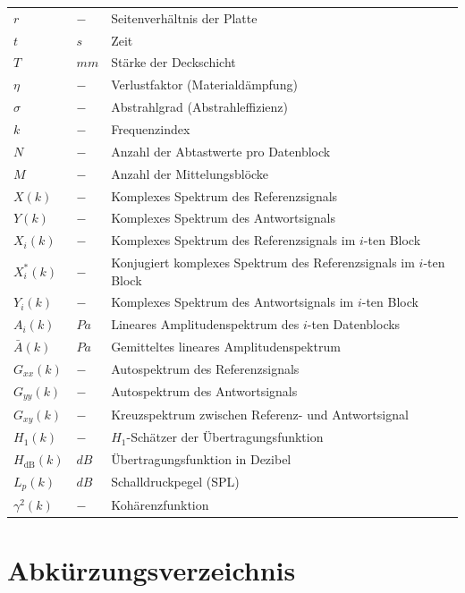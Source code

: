 \begin{longtable}[l]{l l p{8.5cm}}
$r$ & $-$ & Seitenverhältnis der Platte\\

$t$ & $s$ & Zeit\\
$T$ & $mm$ & Stärke der Deckschicht\\

$\eta$ & $-$ & Verlustfaktor (Materialdämpfung)\\
$\sigma$ & $-$ & Abstrahlgrad (Abstrahleffizienz)\\

$k$ & $-$ & Frequenzindex\\
$N$ & $-$ & Anzahl der Abtastwerte pro Datenblock\\
$M$ & $-$ & Anzahl der Mittelungsblöcke\\
$X(k)$ & $-$ & Komplexes Spektrum des Referenzsignals\\
$Y(k)$ & $-$ & Komplexes Spektrum des Antwortsignals\\
$X_i(k)$ & $-$ & Komplexes Spektrum des Referenzsignals im $i$-ten Block\\
$X_i^*(k)$ & $-$ & Konjugiert komplexes Spektrum des Referenzsignals im $i$-ten Block\\
$Y_i(k)$ & $-$ & Komplexes Spektrum des Antwortsignals im $i$-ten Block\\
$A_i(k)$ & $Pa$ & Lineares Amplitudenspektrum des $i$-ten Datenblocks\\
$\bar{A}(k)$ & $Pa$ & Gemitteltes lineares Amplitudenspektrum\\
$G_{xx}(k)$ & $-$ & Autospektrum des Referenzsignals\\
$G_{yy}(k)$ & $-$ & Autospektrum des Antwortsignals\\
$G_{xy}(k)$ & $-$ & Kreuzspektrum zwischen Referenz- und Antwortsignal\\
$H_1(k)$ & $-$ & $H_1$-Schätzer der Übertragungsfunktion\\
$H_{\mathrm{dB}}(k)$ & $dB$ & Übertragungsfunktion in Dezibel\\
$L_p(k)$ & $dB$ & Schalldruckpegel (SPL)\\
$\gamma^2(k)$ & $-$ & Kohärenzfunktion\\

\end{longtable}

\clearpage
\section*{Abk\"urzungsverzeichnis}


